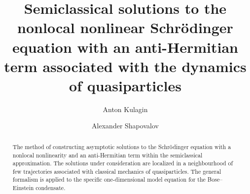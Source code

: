 \begin{englishtitle} %
\title{Semiclassical solutions to the nonlocal nonlinear Schr\"{o}dinger equation with an anti-Hermitian term associated with the dynamics of quasiparticles}
\author{Anton Kulagin  \and  Alexander Shapovalov
}

\maketitle

\begin{abstract}
The method of constructing asymptotic solutions to the Schr\"{o}dinger equation with a nonlocal nonlinearity and an anti-Hermitian term within the semiclassical approximation. The solutions under consideration are localized in a neighbourhood of few trajectories associated with classical mechanics of quasiparticles. The general formalism is applied to the specific one-dimensional model equation for the Bose--Einstein condensate.


\end{abstract}
\end{englishtitle}


\iffalse
%
%


\documentclass[12pt]{llncs}


\usepackage{iftex}

\ifPDFTeX
\usepackage[T2A]{fontenc}
\usepackage[utf8]{inputenc} %
\usepackage[english,russian]{babel}
\fi

